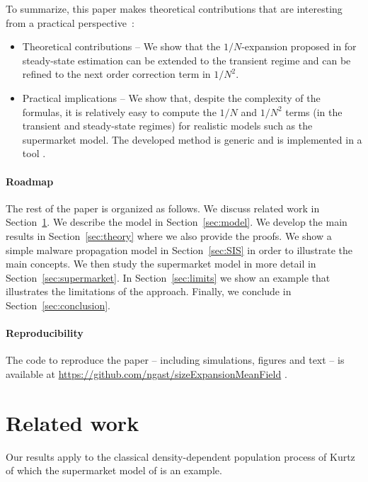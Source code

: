 \documentclass[sigconf]{acmart}
\begin{document}
To summarize, this paper makes theoretical contributions that are
interesting from a practical perspective~:
\begin{itemize}
\item Theoretical contributions -- We show that the $1/N$-expansion
  proposed in \cite{gast2017refined} for steady-state estimation can
  be extended to the transient regime and can be refined to the next
  order correction term in $1/N^2$.
\item Practical implications -- We show that, despite the complexity
  of the formulas, it is relatively easy to compute the $1/N$ and
  $1/N^2$ terms (in the transient and steady-state regimes) for
  realistic models such as the supermarket model. The developed method
  is generic and is implemented in a tool \cite{rmfTool2018}.
\end{itemize}

\paragraph{Roadmap} The rest of the paper is organized as follows. We
discuss related work in Section~\ref{sec:related}. We describe the
model in Section~\ref{sec:model}. We develop the main results in
Section~\ref{sec:theory} where we also provide the proofs.  We show a
simple malware propagation model in Section~\ref{sec:SIS} in order to
illustrate the main concepts. We then study the supermarket model in
more detail in Section~\ref{sec:supermarket}. In
Section~\ref{sec:limits} we show an example that illustrates the
limitations of the approach. Finally, we conclude in
Section~\ref{sec:conclusion}.

\paragraph*{Reproducibility} The code to reproduce the paper --
including simulations, figures and text -- is available at
\url{https://github.com/ngast/sizeExpansionMeanField}
\cite{githubPaper2018}.

\section{Related work}
\label{sec:related}

Our results apply to the classical density-dependent population
process of Kurtz \cite{kurtz1978strong} of which the supermarket model
of \cite{vvedenskaya1996queueing,mitzenmacher1996power} is an
example.  
\end{document}
